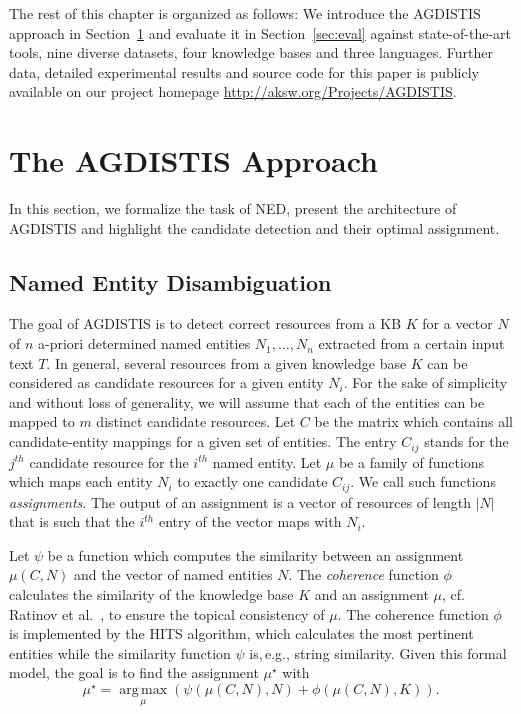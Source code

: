 The rest of this chapter is organized as follows: 
We introduce the AGDISTIS approach in Section~\ref{sec:approach} and evaluate it in Section~\ref{sec:eval} against state-of-the-art tools, nine diverse datasets, four knowledge bases and three languages. 
Further data, detailed experimental results and source code for this paper is publicly available on our project homepage \url{http://aksw.org/Projects/AGDISTIS}.

\section{The AGDISTIS Approach} 
\label{sec:approach}

In this section, we formalize the task of \ac{NED}, present the architecture of AGDISTIS and highlight the candidate detection and their optimal assignment. 

\subsection{Named Entity Disambiguation}
\label{sec:ned}

The goal of AGDISTIS is to detect correct resources from a \ac{KB} $K$ for a vector $N$ of $n$ a-priori determined named entities $N_1,\ldots,N_n$ extracted from a certain input text $T$.
In general, several resources from a given knowledge base $K$ can be considered as candidate resources for a given entity $N_i$.
For the sake of simplicity and without loss of generality, we will assume that each of the entities can be mapped to $m$ distinct candidate resources.
Let $C$ be the matrix which contains all candidate-entity mappings for a given set of entities.
The entry $C_{ij}$ stands for the $j^{th}$ candidate resource for the $i^{th}$ named entity. 
Let $\mu$ be a family of functions which maps each entity $N_i$ to exactly one candidate $C_{ij}$. 
We call such functions \emph{assignments}.
The output of an assignment is a vector of resources of length $|N|$ that is such that the $i^{th}$ entry of the vector maps with $N_i$.

Let $\psi$ be a function which computes the similarity between an assignment $\mu(C,N)$ and the vector of named entities $N$.
The \emph{coherence} function $\phi$ calculates the similarity of the knowledge base $K$ and an assignment $\mu$, cf. Ratinov et al.~\cite{rat:rot}, to ensure the topical consistency of $\mu$.
The coherence function $\phi$ is implemented by the  \ac{HITS} algorithm, which calculates the most pertinent entities while the similarity function $\psi$ is,\,e.g., string similarity.
Given this formal model, the goal is to find the assignment $\mu^\star$ with
\begin{equation*}
\mu^\star= \operatorname*{arg\,max}\limits_{\mu}\left(\psi(\mu(C,N), N) + \phi(\mu(C,N),K)\right).
\end{equation*}

